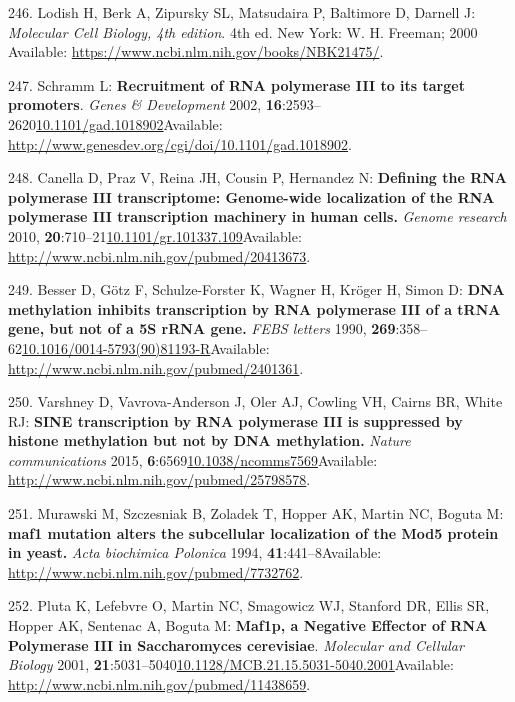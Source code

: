 \documentclass[
]{book}
\begin{document}
\leavevmode\hypertarget{ref-Lodish2000}{}%
246. Lodish H, Berk A, Zipursky SL, Matsudaira P, Baltimore D, Darnell J: \emph{Molecular Cell Biology, 4th edition}. 4th ed. New York: W. H. Freeman; 2000 Available: \url{https://www.ncbi.nlm.nih.gov/books/NBK21475/}.

\leavevmode\hypertarget{ref-Schramm2002}{}%
247. Schramm L: \textbf{Recruitment of RNA polymerase III to its target promoters}. \emph{Genes \& Development} 2002, \textbf{16}:2593--2620\href{https://doi.org/10.1101/gad.1018902}{10.1101/gad.1018902}Available: \url{http://www.genesdev.org/cgi/doi/10.1101/gad.1018902}.

\leavevmode\hypertarget{ref-Canella2010}{}%
248. Canella D, Praz V, Reina JH, Cousin P, Hernandez N: \textbf{Defining the RNA polymerase III transcriptome: Genome-wide localization of the RNA polymerase III transcription machinery in human cells.} \emph{Genome research} 2010, \textbf{20}:710--21\href{https://doi.org/10.1101/gr.101337.109}{10.1101/gr.101337.109}Available: \url{http://www.ncbi.nlm.nih.gov/pubmed/20413673}.

\leavevmode\hypertarget{ref-Besser1990}{}%
249. Besser D, Götz F, Schulze-Forster K, Wagner H, Kröger H, Simon D: \textbf{DNA methylation inhibits transcription by RNA polymerase III of a tRNA gene, but not of a 5S rRNA gene.} \emph{FEBS letters} 1990, \textbf{269}:358--62\href{https://doi.org/10.1016/0014-5793(90)81193-R}{10.1016/0014-5793(90)81193-R}Available: \url{http://www.ncbi.nlm.nih.gov/pubmed/2401361}.

\leavevmode\hypertarget{ref-Varshney2015}{}%
250. Varshney D, Vavrova-Anderson J, Oler AJ, Cowling VH, Cairns BR, White RJ: \textbf{SINE transcription by RNA polymerase III is suppressed by histone methylation but not by DNA methylation.} \emph{Nature communications} 2015, \textbf{6}:6569\href{https://doi.org/10.1038/ncomms7569}{10.1038/ncomms7569}Available: \url{http://www.ncbi.nlm.nih.gov/pubmed/25798578}.

\leavevmode\hypertarget{ref-Murawski1994}{}%
251. Murawski M, Szczesniak B, Zoladek T, Hopper AK, Martin NC, Boguta M: \textbf{maf1 mutation alters the subcellular localization of the Mod5 protein in yeast.} \emph{Acta biochimica Polonica} 1994, \textbf{41}:441--8Available: \url{http://www.ncbi.nlm.nih.gov/pubmed/7732762}.

\leavevmode\hypertarget{ref-Pluta2001}{}%
252. Pluta K, Lefebvre O, Martin NC, Smagowicz WJ, Stanford DR, Ellis SR, Hopper AK, Sentenac A, Boguta M: \textbf{Maf1p, a Negative Effector of RNA Polymerase III in Saccharomyces cerevisiae}. \emph{Molecular and Cellular Biology} 2001, \textbf{21}:5031--5040\href{https://doi.org/10.1128/MCB.21.15.5031-5040.2001}{10.1128/MCB.21.15.5031-5040.2001}Available: \url{http://www.ncbi.nlm.nih.gov/pubmed/11438659}.
\end{document}
